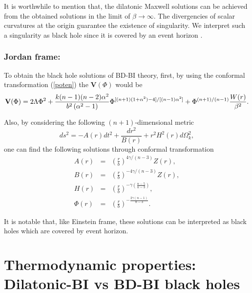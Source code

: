 \documentclass[aps,onecolumn ]{revtex4}
\begin{document}
It is worthwhile to mention that, the dilatonic Maxwell solutions \cite%
{Sheikhi} can be achieved from the obtained solutions in the limit
of $\beta \rightarrow \infty $. The divergencies of scalar
curvatures at the origin guarantee the existence of singularity.
We interpret such a singularity as black hole since it is covered
by an event horizon \cite{BDvsDilaton}.

\subsubsection{\textbf{Jordan frame:}}

To obtain the black hole solutions of BD-BI theory, first, by
using the conformal transformation (\ref{poten}) the
$\mathbf{V}(\Phi )$ would be
\begin{equation}
\mathbf{V}(\Phi )=2\Lambda \Phi ^{2}+\frac{k(n-1)(n-2)\alpha ^{2}}{%
b^{2}\left( \alpha ^{2}-1\right) }\Phi ^{\lbrack (n+1)(1+\alpha
^{2})-4]/[(n-1)\alpha ^{2}]}+\Phi ^{(n+1)/(n-1)}\frac{W(r)}{\beta ^{2}}.
\label{V(phi)}
\end{equation}

Also, by considering the following $(n+1)$-dimensional metric
\begin{equation}
ds^{2}=-A(r)dt^{2}+\frac{dr^{2}}{B(r)}+r^{2}H^{2}(r)d\Omega _{k}^{2},
\label{metric1}
\end{equation}
one can find the following solutions through conformal transformation
\begin{eqnarray}
A(r) &=&\left( \frac{r}{b}\right) ^{4\gamma /\left( n-3\right) }Z\left(
r\right) ,  \label{A(r)} \\
B(r) &=&\left( \frac{r}{b}\right) ^{-4\gamma /\left( n-3\right) }Z\left(
r\right) ,  \label{B(r)} \\
H(r) &=&\left( \frac{r}{b}\right) ^{-\gamma (\frac{n-5}{n-3})},  \label{H(r)}
\\
\Phi \left( r\right) &=&\left( \frac{r}{b}\right) ^{-\frac{2\gamma \left(
n-1\right) }{n-3}}.  \label{Phi}
\end{eqnarray}

It is notable that, like Einstein frame, these solutions can be
interpreted as black holes which are covered by event horizon.

\section{Thermodynamic properties: Dilatonic-BI vs BD-BI black holes \label{p-vb}}
\end{document}
